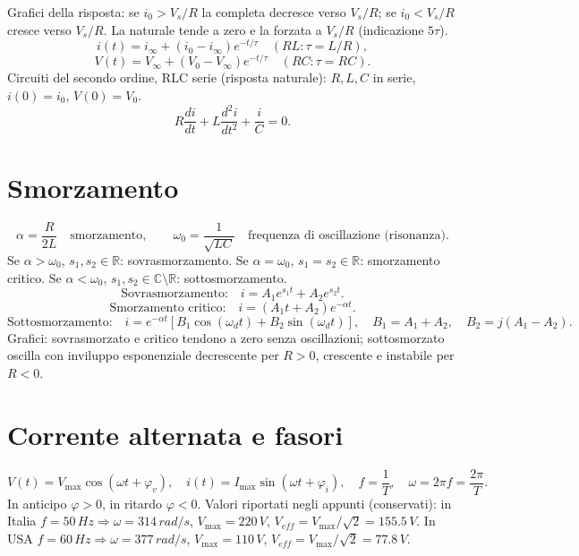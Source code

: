 \documentclass[11pt,a4paper]{article}
\newcommand{\pagina}[2]{\clearpage\section*{#2}}
\begin{document}
Grafici della risposta: se $i_0>V_s/R$ la completa decresce verso $V_s/R$; se $i_0<V_s/R$ cresce verso $V_s/R$. La naturale tende a zero e la forzata a $V_s/R$ (indicazione $5\tau$).
\[i(t)=i_\infty+(i_0-i_\infty)e^{-t/\tau}\quad(RL:\tau=L/R),\]
\[V(t)=V_\infty+(V_0-V_\infty)e^{-t/\tau}\quad(RC:\tau=RC).\]
Circuiti del secondo ordine, RLC serie (risposta naturale): $R,L,C$ in serie, $i(0)=i_0$, $V(0)=V_0$.
\[R\frac{di}{dt}+L\frac{d^2i}{dt^2}+\frac iC=0.\]
\pagina{22}{Smorzamento}
\[\alpha=\frac R{2L}\quad\text{smorzamento},\qquad\omega_0=\frac1{\sqrt{LC}}\quad\text{frequenza di oscillazione (risonanza)}.\]
Se $\alpha>\omega_0$, $s_1,s_2\in\mathbb R$: sovrasmorzamento. Se $\alpha=\omega_0$, $s_1=s_2\in\mathbb R$: smorzamento critico. Se $\alpha<\omega_0$, $s_1,s_2\in\mathbb C\setminus\mathbb R$: sottosmorzamento.
\[\text{Sovrasmorzamento:}\quad i=A_1e^{s_1t}+A_2e^{s_2t}.\]
\[\text{Smorzamento critico:}\quad i=(A_1t+A_2)e^{-\alpha t}.\]
\[\text{Sottosmorzamento:}\quad i=e^{-\alpha t}[B_1\cos(\omega_dt)+B_2\sin(\omega_dt)],\quad B_1=A_1+A_2,\quad B_2=j(A_1-A_2).\]
Grafici: sovrasmorzato e critico tendono a zero senza oscillazioni; sottosmorzato oscilla con inviluppo esponenziale decrescente per $R>0$, crescente e instabile per $R<0$.
\pagina{23}{Corrente alternata e fasori}
\[V(t)=V_{\max}\cos(\omega t+\varphi_v),\quad i(t)=I_{\max}\sin(\omega t+\varphi_i),\quad f=\frac1T,\quad\omega=2\pi f=\frac{2\pi}T.\]
In anticipo $\varphi>0$, in ritardo $\varphi<0$. Valori riportati negli appunti (conservati): in Italia $f=50\,Hz\Rightarrow\omega=314\,rad/s$, $V_{\max}=220\,V$, $V_{eff}=V_{\max}/\sqrt2=155.5\,V$. In USA $f=60\,Hz\Rightarrow\omega=377\,rad/s$, $V_{\max}=110\,V$, $V_{eff}=V_{\max}/\sqrt2=77.8\,V$.
\end{document}
